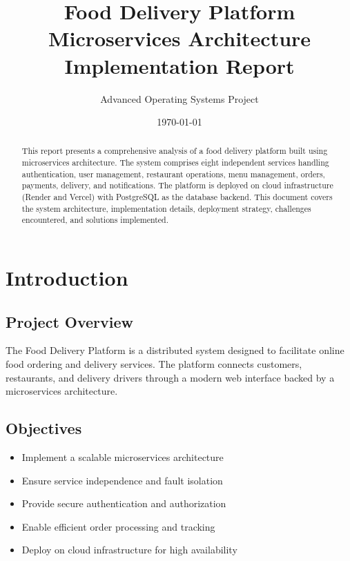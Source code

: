 \documentclass[12pt,a4paper]{article}
\title{\textbf{Food Delivery Platform} \\ 
\large Microservices Architecture Implementation Report}
\author{Advanced Operating Systems Project}
\date{\today}
\begin{document}
\maketitle
\thispagestyle{empty}

\begin{abstract}
This report presents a comprehensive analysis of a food delivery platform built using microservices architecture. The system comprises eight independent services handling authentication, user management, restaurant operations, menu management, orders, payments, delivery, and notifications. The platform is deployed on cloud infrastructure (Render and Vercel) with PostgreSQL as the database backend. This document covers the system architecture, implementation details, deployment strategy, challenges encountered, and solutions implemented.
\end{abstract}

\newpage
\tableofcontents
\newpage

\section{Introduction}

\subsection{Project Overview}
The Food Delivery Platform is a distributed system designed to facilitate online food ordering and delivery services. The platform connects customers, restaurants, and delivery drivers through a modern web interface backed by a microservices architecture.

\subsection{Objectives}
\begin{itemize}
    \item Implement a scalable microservices architecture
    \item Ensure service independence and fault isolation
    \item Provide secure authentication and authorization
    \item Enable efficient order processing and tracking
    \item Deploy on cloud infrastructure for high availability
\end{itemize}
\end{document}
